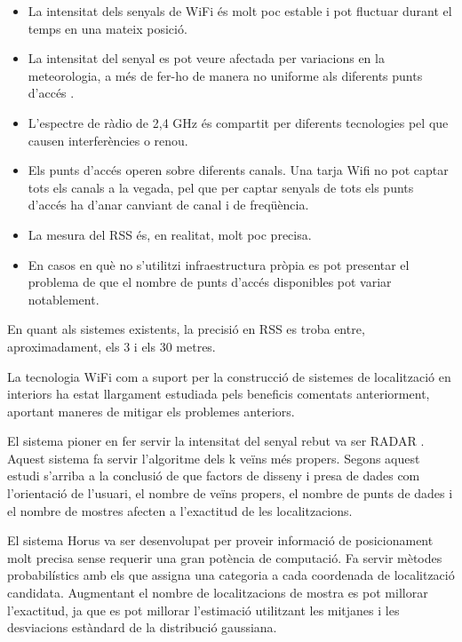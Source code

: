 \begin{itemize}

    \item La intensitat dels senyals de WiFi és molt poc estable i pot fluctuar durant el temps en una mateix posició.
    \item La intensitat del senyal es pot veure afectada per variacions en la meteorologia, a més de fer-ho de manera no uniforme als diferents punts d'accés \cite{crane}.
    \item L'espectre de ràdio de 2,4 GHz és compartit per diferents tecnologies pel que causen interferències o renou.
    \item Els punts d'accés operen sobre diferents canals. Una tarja Wifi no pot captar tots els canals a la vegada, pel que per captar senyals de tots els punts d'accés ha d'anar canviant de canal i de freqüència.
    \item La mesura del RSS és, en realitat, molt poc precisa.
    \item En casos en què no s’utilitzi infraestructura pròpia es pot presentar el problema de que el nombre de punts d'accés disponibles pot variar notablement.

\end{itemize}

En quant als sistemes existents, la precisió en RSS es troba entre, aproximadament, els 3 i els 30 metres.

La tecnologia WiFi com a suport per la construcció de sistemes de localització en interiors ha estat llargament estudiada pels beneficis comentats anteriorment, aportant maneres de mitigar els problemes anteriors.

El sistema pioner en fer servir la intensitat del senyal rebut va ser RADAR \cite{bahl}. Aquest sistema fa servir l'algoritme dels k veïns més propers. Segons aquest estudi s'arriba a la conclusió de que factors de disseny i presa de dades com l'orientació de l'usuari, el nombre de veïns propers, el nombre de punts de dades i el nombre de mostres afecten a l'exactitud de les localitzacions.

El sistema Horus \cite{youssef} va ser desenvolupat per proveir informació de posicionament molt precisa sense requerir una gran potència de computació. Fa servir mètodes probabilístics amb els que assigna una categoria a cada coordenada de localització candidata. Augmentant el nombre de localitzacions de mostra es pot millorar l'exactitud, ja que es pot millorar l'estimació utilitzant les mitjanes i les desviacions estàndard de la distribució gaussiana.

